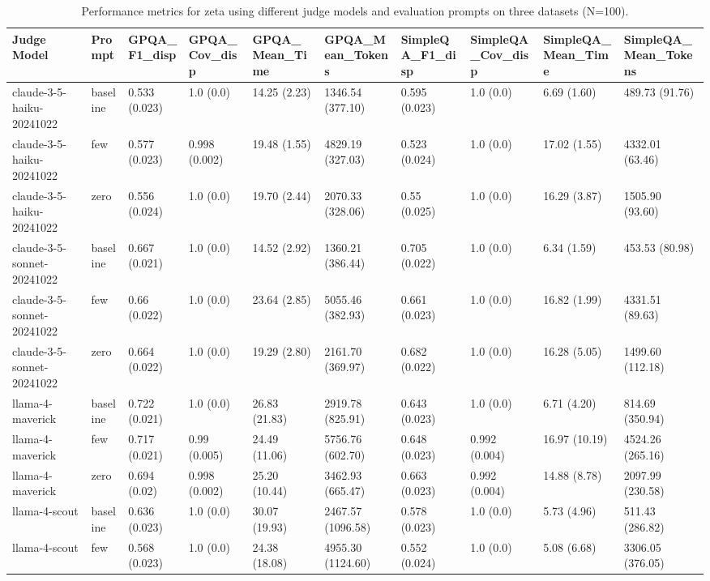 \begin{table}[htbp]
\caption{Performance metrics for zeta using different judge models and evaluation prompts on three datasets (N=100).}
\label{tab:finalperfuni}
\begin{tabular}{llllllllll}
\toprule
Judge Model & Prompt & GPQA_F1_disp & GPQA_Cov_disp & GPQA_Mean_Time & GPQA_Mean_Tokens & SimpleQA_F1_disp & SimpleQA_Cov_disp & SimpleQA_Mean_Time & SimpleQA_Mean_Tokens \\
\midrule
claude-3-5-haiku-20241022 & baseline & 0.533 (0.023) & 1.0 (0.0) &  14.25 (2.23) & 1346.54 (377.10) & 0.595 (0.023) & 1.0 (0.0) &   6.69 (1.60) & 489.73 (91.76) \\
claude-3-5-haiku-20241022 & few & 0.577 (0.023) & 0.998 (0.002) &  19.48 (1.55) & 4829.19 (327.03) & 0.523 (0.024) & 1.0 (0.0) &  17.02 (1.55) & 4332.01 (63.46) \\
claude-3-5-haiku-20241022 & zero & 0.556 (0.024) & 1.0 (0.0) &  19.70 (2.44) & 2070.33 (328.06) & 0.55 (0.025) & 1.0 (0.0) &  16.29 (3.87) & 1505.90 (93.60) \\
claude-3-5-sonnet-20241022 & baseline & 0.667 (0.021) & 1.0 (0.0) &  14.52 (2.92) & 1360.21 (386.44) & 0.705 (0.022) & 1.0 (0.0) &   6.34 (1.59) & 453.53 (80.98) \\
claude-3-5-sonnet-20241022 & few & 0.66 (0.022) & 1.0 (0.0) &  23.64 (2.85) & 5055.46 (382.93) & 0.661 (0.023) & 1.0 (0.0) &  16.82 (1.99) & 4331.51 (89.63) \\
claude-3-5-sonnet-20241022 & zero & 0.664 (0.022) & 1.0 (0.0) &  19.29 (2.80) & 2161.70 (369.97) & 0.682 (0.022) & 1.0 (0.0) &  16.28 (5.05) & 1499.60 (112.18) \\
llama-4-maverick & baseline & 0.722 (0.021) & 1.0 (0.0) &  26.83 (21.83) & 2919.78 (825.91) & 0.643 (0.023) & 1.0 (0.0) &   6.71 (4.20) & 814.69 (350.94) \\
llama-4-maverick & few & 0.717 (0.021) & 0.99 (0.005) &  24.49 (11.06) & 5756.76 (602.70) & 0.648 (0.023) & 0.992 (0.004) &  16.97 (10.19) & 4524.26 (265.16) \\
llama-4-maverick & zero & 0.694 (0.02) & 0.998 (0.002) &  25.20 (10.44) & 3462.93 (665.47) & 0.663 (0.023) & 0.992 (0.004) &  14.88 (8.78) & 2097.99 (230.58) \\
llama-4-scout & baseline & 0.636 (0.023) & 1.0 (0.0) &  30.07 (19.93) & 2467.57 (1096.58) & 0.578 (0.023) & 1.0 (0.0) &   5.73 (4.96) & 511.43 (286.82) \\
llama-4-scout & few & 0.568 (0.023) & 1.0 (0.0) &  24.38 (18.08) & 4955.30 (1124.60) & 0.552 (0.024) & 1.0 (0.0) &   5.08 (6.68) & 3306.05 (376.05) \\

\end{tabular}
\end{table}
